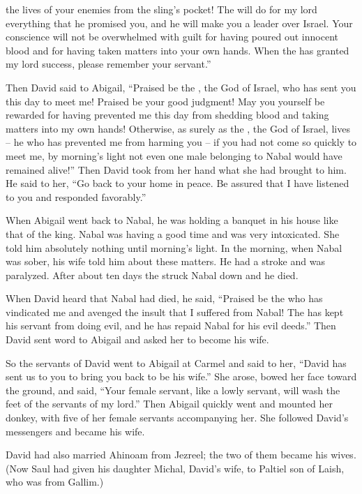{the lives
of your enemies
from
the sling’s
pocket!
The
{}
will
do
for
my lord
everything
that
he promised
you, and he will make you a leader
over
Israel.
Your conscience will not
be
overwhelmed
with guilt
for having poured out
innocent
blood
and for having taken matters
into your own hands. When the
{}
has granted
my lord
success, please remember
your servant.”
\par }{\PP {}Then David
said
to Abigail,
“Praised
be the
{},
the God
of Israel,
who
has sent
you this
day
to meet me!
Praised
be your good judgment! May you
yourself be rewarded
for having prevented
me this
day
from shedding
blood
and taking matters
into my own hands!
Otherwise, as surely as
the {}, the God
of Israel,
lives
– he who has
prevented
me from harming you – if you had not come so quickly to meet me, by morning’s light not even one male belonging to Nabal would have remained alive!”
Then David
took
from her hand
what she had brought
to him. He said
to her, “Go
back to your home
in peace.
Be assured
that I have listened
to you and responded
favorably.”
\par }{\PP {}When Abigail
went back
to
Nabal,
he was holding
a banquet
in
his
house
like that of the king.
Nabal
was having a good
time
and was very
intoxicated.
She told
him absolutely
nothing
until
morning’s
light.
In the morning,
when Nabal
was sober,
his wife
told
him about these
matters.
He had a stroke
and was
paralyzed.
After
about ten
days
the {}
struck
Nabal
down and he died.
\par }{\PP {}When David
heard
that
Nabal
had died,
he said,
“Praised
be the
{}
who
has vindicated
me and avenged
the insult
that
I suffered from Nabal! The
{}
has kept
his servant
from doing evil,
and he has repaid
Nabal
for his evil
deeds.”
Then David
sent
word
to Abigail
and asked
her to become
his wife.
\par }{\PP {}So the servants
of David
went
to
Abigail
at Carmel
and said
to
her, “David
has sent
us to
you to bring
you back
to be his wife.”
She arose,
bowed
her face
toward the ground,
and said,
“Your female servant,
like a lowly servant,
will wash
the feet
of the servants
of my lord.”
Then
Abigail
quickly
went and mounted
her donkey,
with five
of her female
servants accompanying
her. She followed
David’s
messengers
and became
his wife.
\par }{\PP {}David
had also
married
Ahinoam
from Jezreel;
the two
of them became his wives.
(Now Saul
had given
his daughter
Michal,
David’s
wife,
to Paltiel
son
of Laish,
who
was from Gallim.)

}
